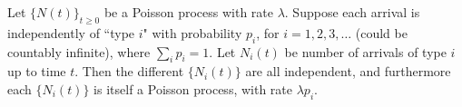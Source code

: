\documentclass[11pt]{article}
\begin{document}
    \proposition[thin]
    Let $\{N(t)\}_{t \geq 0}$ be a Poisson process with rate $\lambda$. Suppose each arrival is independently of ``type $i$" with probability $p_i$, for $i = 1, 2, 3, \hdots$ (could be countably infinite), where $\sum_i p_i = 1$. Let $N_i(t)$ be number of arrivals of type $i$ up to time $t$. Then the different $\{N_i(t)\}$ are all independent, and furthermore each $\{N_i(t)\}$ is itself a Poisson process, with rate $\lambda p_i$.
    
          
    
    
    
    
    
    
    
    
    
    
    
    
    
    
    
    
    
    
\end{document}
